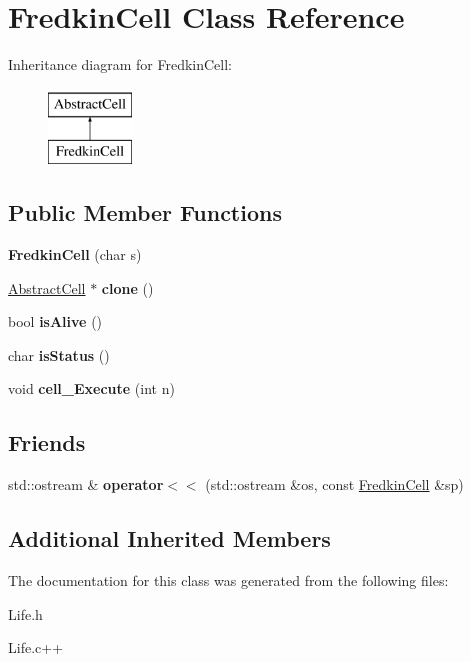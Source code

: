 \hypertarget{classFredkinCell}{\section{Fredkin\-Cell Class Reference}
\label{classFredkinCell}
}
Inheritance diagram for Fredkin\-Cell\-:\begin{figure}[H]
\begin{center}
\leavevmode
\includegraphics[height=2.000000cm]{classFredkinCell}
\end{center}
\end{figure}
\subsection*{Public Member Functions}
\begin{DoxyCompactItemize}
\item 
\hypertarget{classFredkinCell_a63acb9b6a4856b637b1475dd90958456}{{\bfseries Fredkin\-Cell} (char s)}\label{classFredkinCell_a63acb9b6a4856b637b1475dd90958456}

\item 
\hypertarget{classFredkinCell_a74d57ef05a09748127cb5b4a98c98192}{\hyperlink{classAbstractCell}{Abstract\-Cell} $\ast$ {\bfseries clone} ()}\label{classFredkinCell_a74d57ef05a09748127cb5b4a98c98192}

\item 
\hypertarget{classFredkinCell_a836097b769671606f7203961ddd8a52e}{bool {\bfseries is\-Alive} ()}\label{classFredkinCell_a836097b769671606f7203961ddd8a52e}

\item 
\hypertarget{classFredkinCell_a5e36ba49cec6b3570ebad41002cd43f6}{char {\bfseries is\-Status} ()}\label{classFredkinCell_a5e36ba49cec6b3570ebad41002cd43f6}

\item 
\hypertarget{classFredkinCell_a18ed9dbd44e9c89b38641dcfc20c147f}{void {\bfseries cell\-\_\-\-Execute} (int n)}\label{classFredkinCell_a18ed9dbd44e9c89b38641dcfc20c147f}

\end{DoxyCompactItemize}
\subsection*{Friends}
\begin{DoxyCompactItemize}
\item 
\hypertarget{classFredkinCell_a447820528b5f71838897a044f6e0c9b4}{std\-::ostream \& {\bfseries operator$<$$<$} (std\-::ostream \&os, const \hyperlink{classFredkinCell}{Fredkin\-Cell} \&sp)}\label{classFredkinCell_a447820528b5f71838897a044f6e0c9b4}

\end{DoxyCompactItemize}
\subsection*{Additional Inherited Members}


The documentation for this class was generated from the following files\-:\begin{DoxyCompactItemize}
\item 
Life.\-h\item 
Life.\-c++\end{DoxyCompactItemize}
